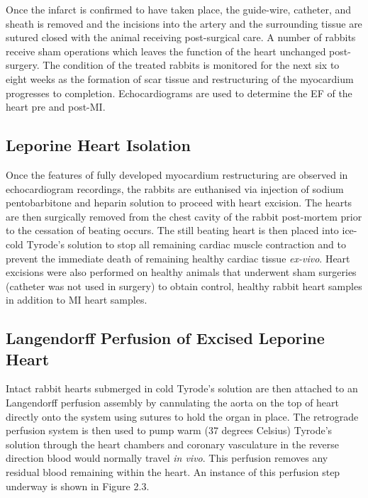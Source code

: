  Once the infarct is confirmed to have taken place, the guide-wire, catheter, and sheath is removed and the incisions into the artery and the surrounding tissue are sutured closed with the animal receiving post-surgical care. A number of rabbits receive sham operations which leaves the function of the heart unchanged post-surgery. The condition of the treated rabbits is monitored for the next six to eight weeks as the formation of scar tissue and restructuring of the myocardium progresses to completion. Echocardiograms are used to determine the EF of the heart pre and post-MI. 


\subsection{Leporine Heart Isolation}
Once the features of fully developed myocardium restructuring are observed in echocardiogram recordings, the rabbits are euthanised via injection of sodium pentobarbitone and heparin solution to proceed with heart excision. The hearts are then surgically removed from the chest cavity of the rabbit post-mortem prior to the cessation of beating occurs. The still beating heart is then placed into ice-cold Tyrode's solution to stop all remaining cardiac muscle contraction and to prevent the immediate death of remaining healthy cardiac tissue \textit{ex-vivo}. Heart excisions were also performed on healthy animals that underwent sham surgeries (catheter was not used in surgery) to obtain control, healthy rabbit heart samples in addition to MI heart samples.



\subsection{Langendorff Perfusion of Excised Leporine Heart}
Intact rabbit hearts submerged in cold Tyrode's solution are then attached to an Langendorff perfusion assembly by cannulating the aorta on the top of heart directly onto the system using sutures to hold the organ in place. The retrograde perfusion system is then used to pump warm (37 degrees Celsius) Tyrode's solution through the heart chambers and coronary vasculature in the reverse direction blood would normally travel \textit{in vivo}. This perfusion removes any residual blood remaining within the heart. An instance of this perfusion step underway is shown in Figure 2.3.

